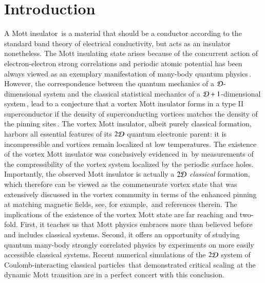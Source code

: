 \documentclass[aps,twocolumn,prl,10pt,amsmath,amssymb,nofootinbib,showpacs,superscriptaddress,floatfix]{revtex4-1}
\begin{document}
\section*{Introduction}
A Mott insulator\,\cite{PM:1937,Mott:1949,Mott:1990} is a material that should be a conductor according to the standard band theory of electrical conductivity, but acts as an insulator nonetheless. The Mott insulating state arises because of the concurrent action of electron-electron strong correlations and periodic atomic potential has been always viewed as an exemplary manifestation of many-body quantum physics\,\cite{Sachdev:book}. However, 
 the correspondence between the quantum mechanics of a ${\cal D}$-dimensional system and the classical statistical mechanics of a ${\cal D}+1$-dimensional system\,\cite{Polyakov:1987}, lead to a conjecture that a vortex Mott insulator forms in a type II superconductor if the density of superconducting vortices matches the density of the pinning sites\,\cite{Nelson}. The vortex Mott insulator, albeit purely classical formation, harbors all essential features of its ${2\cal D}$ quantum electronic parent: it is incompressible and vortices remain localized at low temperatures. The existence of the vortex Mott insulator was conclusively evidenced in\,\cite{Zeldov:2009} by measurements of the compressibility of the vortex system localized by the periodic surface holes. Importantly, the observed Mott insulator is actually a ${2\cal D}$ \textit{classical} formation, which therefore can be viewed as the commensurate vortex state that was extensively discussed in the vortex community in terms of the enhanced pinning at matching magnetic fields, see, for example,\,\cite{Moshchalkov:1998} and references therein. The implications of the existence of the vortex Mott state are far reaching and two-fold. First, it teaches us that Mott physics embraces more than believed before and includes classical systems. Second, it offers an opportunity of studying quantum many-body strongly correlated physics by experiments on more easily accessible classical systems. Recent numerical simulations of the $2{\cal D}$ system of Coulomb-interacting classical particles\,\cite{Louk:2017} that demonstrated critical scaling at the dynamic Mott transition are in a perfect concert with this conclusion.
\end{document}
